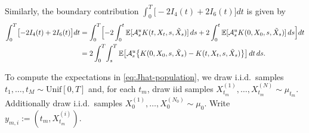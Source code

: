 \documentclass[11pt,leqno]{article}
\theoremstyle{plain}
\theoremstyle{remark}
\theoremstyle{definition}
\numberwithin{equation}{section}
\numberwithin{figure}{section}
\numberwithin{table}{section}
\begin{document}
Similarly, the boundary contribution $\int_0^T\bigl[-2 I_4(t)+2 I_6(t)\bigr]dt$ is given by 
\begin{align*}
 \int_0^T\bigl[-2 I_4(t)+2 I_6(t)\bigr]dt &= 
  \int_0^T\Bigl[-2\int_0^t\mathbb{E}[\mathcal{A}^u_s K(t,X_t,s,\tilde{X}_s)]\,ds
   + 2\int_0^t\mathbb{E}[\mathcal{A}^u_s K(0,X_0,s,\tilde{X}_s)]\,ds\Bigr]dt \\
 &= 2\int_0^T\!\int_s^T\mathbb{E}\bigl[\mathcal{A}^u_s\bigl\{K(0,X_0,s,\tilde{X}_s) - K(t,X_t,s,\tilde{X}_s)\bigr\}\bigr]\,dt\,ds.
\end{align*}

To compute the expectations in \eqref{eq:Jhat-population}, we 
draw i.i.d.~samples $t_1,\ldots,t_M\sim \mathrm{Unif}[0,T]$ and, for each $t_m$, draw iid samples $X_{t_m}^{(1)},\ldots,X_{t_m}^{(N)}\sim\mu_{t_m}$.
Additionally draw i.i.d.~samples $X_0^{(1)},\ldots,X_0^{(N_0)} \sim \mu_0$.
Write $y_{m,i}:=(t_m, X_{t_m}^{(i)})$.
\end{document}
